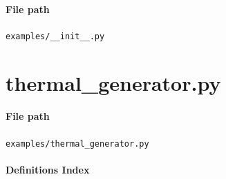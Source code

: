 \documentclass[11pt]{report}
\begin{document}
\paragraph{File path} \texttt{examples/\_\_init\_\_.py}

\section{thermal\_generator.py}
\label{file:examples-thermal_generator.py}
\paragraph{File path} \texttt{examples/thermal\_generator.py}
\paragraph{Definitions Index}
\end{document}
